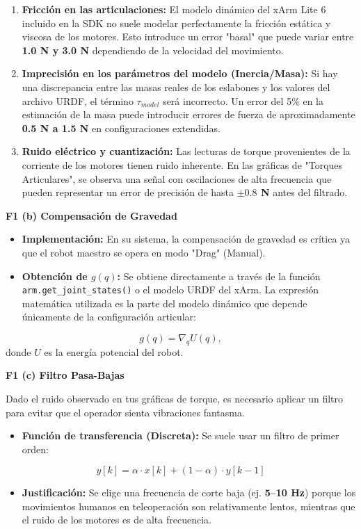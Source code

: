 \documentclass[journal,10pt,twoside]{IEEEtran}
\begin{document}
\begin{enumerate}
  \item \textbf{Fricción en las articulaciones:} El modelo dinámico del xArm Lite 6 incluido en la SDK no suele modelar perfectamente la fricción estática y viscosa de los motores. Esto introduce un error "basal" que puede variar entre \textbf{1.0 N y 3.0 N} dependiendo de la velocidad del movimiento.
  \item \textbf{Imprecisión en los parámetros del modelo (Inercia/Masa):} Si hay una discrepancia entre las masas reales de los eslabones y los valores del archivo URDF, el término $\tau_{model}$ será incorrecto. Un error del 5\% en la estimación de la masa puede introducir errores de fuerza de aproximadamente \textbf{0.5 N a 1.5 N} en configuraciones extendidas.
  \item \textbf{Ruido eléctrico y cuantización:} Las lecturas de torque provenientes de la corriente de los motores tienen ruido inherente. En las gráficas de "Torques Articulares", se observa una señal con oscilaciones de alta frecuencia que pueden representar un error de precisión de hasta \textbf{$\pm 0.8$ N} antes del filtrado.
\end{enumerate}

\textbf{F1 (b) Compensación de Gravedad}

\begin{itemize}
  \item \textbf{Implementación:} En su sistema, la compensación de gravedad es crítica ya que el robot maestro se opera en modo "Drag" (Manual).
  \item \textbf{Obtención de $g(q)$:} Se obtiene directamente a través de la función \texttt{arm.get\_joint\_states()} o el modelo URDF del xArm. La expresión matemática utilizada es la parte del modelo dinámico que depende únicamente de la configuración articular:
\end{itemize}
\[
  g(q) = \nabla_q U(q),
\]
donde $U$ es la energía potencial del robot.

\textbf{F1 (c) Filtro Pasa-Bajas}

Dado el ruido observado en tus gráficas de torque, es necesario aplicar un filtro para evitar que el operador sienta vibraciones fantasma.

\begin{itemize}
  \item \textbf{Función de transferencia (Discreta):} Se suele usar un filtro de primer orden:
\end{itemize}
\[
  y[k] = \alpha \cdot x[k] + (1-\alpha)\cdot y[k-1]
\]
\begin{itemize}
  \item \textbf{Justificación:} Se elige una frecuencia de corte baja (ej. \textbf{5--10 Hz}) porque los movimientos humanos en teleoperación son relativamente lentos, mientras que el ruido de los motores es de alta frecuencia.
\end{itemize}
\end{document}
